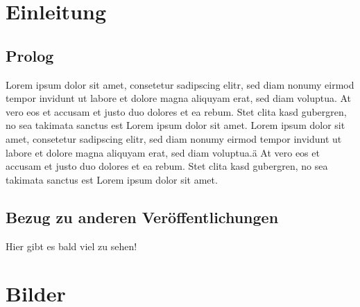 \documentclass{article}
\begin{document}
    \setupSeminararbeit{}
    


    \section{Einleitung}
    \subsection{Prolog}
    Lorem ipsum dolor sit amet, consetetur sadipscing elitr, sed diam nonumy eirmod tempor invidunt ut labore et dolore magna aliquyam erat, sed diam voluptua.
    At vero eos et accusam et justo duo dolores et ea rebum.
    Stet clita kasd gubergren, no sea takimata sanctus est Lorem ipsum dolor sit amet.
    Lorem ipsum dolor sit amet, consetetur sadipscing elitr, sed diam nonumy eirmod tempor invidunt ut labore et dolore magna aliquyam erat, sed diam voluptua.ä
    At vero eos et accusam et justo duo dolores et ea rebum. Stet clita kasd gubergren, no sea takimata sanctus est Lorem ipsum dolor sit amet.

    \subsection{Bezug zu anderen Veröffentlichungen}
    Hier gibt es bald viel zu sehen!
    \newpage




    \section{Bilder}
\end{document}
